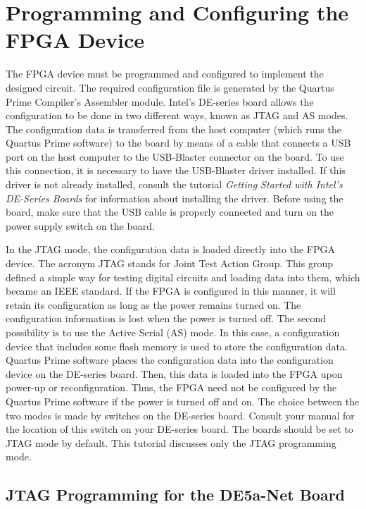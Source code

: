 \section{Programming and Configuring the FPGA Device}


The FPGA device must be programmed and configured to implement the designed 
circuit. The required configuration file is generated by the Quartus Prime 
Compiler's Assembler module. Intel's DE-series board allows the configuration to 
be done in two different ways, known as JTAG and AS modes.
The configuration data is transferred from the host computer (which runs the 
Quartus Prime software) to the board by means of a cable that connects 
a USB port on the host computer to the USB-Blaster connector on the board.
To use this connection, it is necessary to have the USB-Blaster driver 
installed. If this driver is not already installed, consult the 
tutorial {\it Getting Started with Intel's DE-Series Boards}
for information about installing the driver.
Before using the board, make sure that the USB cable is properly connected
and turn on the power supply switch on the board.
 
In the JTAG mode, the configuration data is loaded directly
into the FPGA device. The acronym JTAG stands for Joint Test Action Group. 
This group defined a simple way for testing digital circuits and loading data 
into them, which became an IEEE standard. If the FPGA is configured in 
this manner, it will retain its 
configuration as long as the power remains turned on. 
The configuration information is lost when the power is turned off.
The second possibility is to use the Active Serial (AS) mode.
In this case, a configuration device that includes some flash memory is used 
to store the configuration data. Quartus Prime software places the configuration 
data into the configuration device on the DE-series board. Then, this data is loaded 
into the FPGA upon power-up or reconfiguration.
Thus, the FPGA need not be configured by the Quartus Prime software if the power 
is turned off and on. 
The choice between the two modes is made by switches on the DE-series 
board. Consult your manual for the location of this switch on your DE-series board. The boards should be set to JTAG mode by default.
This tutorial discusses only the JTAG programming mode.

\subsection{JTAG Programming for the DE5a-Net Board}

